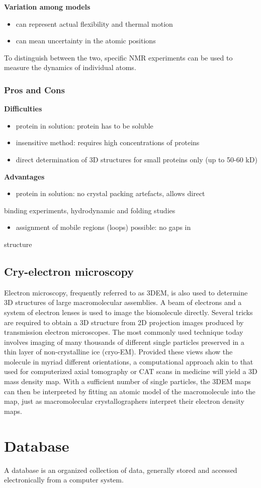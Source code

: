 \documentclass[11pt]{article}
\begin{document}
\textbf{Variation among models}\\
\begin{itemize}
\item can represent actual flexibility and thermal motion
\item can mean uncertainty in the atomic positions
\end{itemize}

To distinguish between the two, specific NMR experiments can be used to measure the dynamics
of individual atoms.

\subsubsection{Pros and Cons}
\label{sec:orgeb3c9e8}
\textbf{Difficulties}
\begin{itemize}
\item protein in solution: protein has to be soluble
\item insensitive method: requires high concentrations of proteins
\item direct determination of 3D structures for small proteins only
(up to 50-60 kD)
\end{itemize}


\textbf{Advantages}
\begin{itemize}
\item protein in solution: no crystal packing artefacts, allows direct
\end{itemize}
binding experiments, hydrodynamic and folding studies
\begin{itemize}
\item assignment of mobile regions (loops) possible: no gaps in
\end{itemize}
structure


\subsection{Cry-electron microscopy}
\label{sec:orgdaa4032}
Electron microscopy, frequently referred to as 3DEM, is also used to determine 3D structures
of large macromolecular assemblies. A beam of electrons and a system of electron lenses is
used to image the biomolecule directly. Several tricks are required to obtain a 3D structure
from 2D projection images produced by transmission electron microscopes. The most commonly
used technique today involves imaging of many thousands of different single particles
preserved in a thin layer of non-crystalline ice (cryo-EM). Provided these views show the
molecule in myriad different orientations, a computational approach akin to that used for
computerized axial tomography or CAT scans in medicine will yield a 3D mass density map. With
a sufficient number of single particles, the 3DEM maps can then be interpreted by fitting an
atomic model of the macromolecule into the map, just as macromolecular crystallographers
interpret their electron density maps.



\section{Database}
\label{sec:org224ecf3}
A database is an organized collection of data, generally stored and accessed electronically from a computer system.
\end{document}
